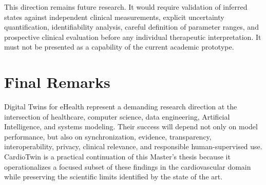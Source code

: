 This direction remains future research. It would require validation of inferred states against independent clinical measurements, explicit uncertainty quantification, identifiability analysis, careful definition of parameter ranges, and prospective clinical evaluation before any individual therapeutic interpretation. It must not be presented as a capability of the current academic prototype.

\section{Final Remarks}
Digital Twins for eHealth represent a demanding research direction at the intersection of healthcare, computer science, data engineering, Artificial Intelligence, and systems modeling. Their success will depend not only on model performance, but also on synchronization, evidence, transparency, interoperability, privacy, clinical relevance, and responsible human-supervised use. CardioTwin is a practical continuation of this Master’s thesis because it operationalizes a focused subset of these findings in the cardiovascular domain while preserving the scientific limits identified by the state of the art.

\clearpage
